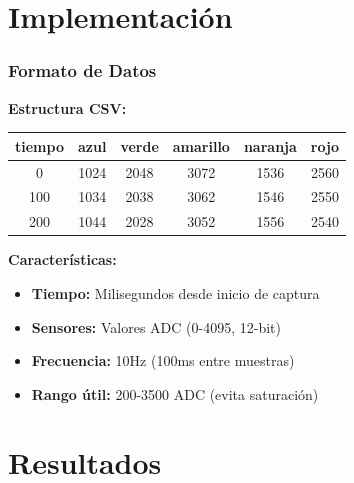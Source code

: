 \documentclass[xcolor=dvipsnames]{beamer}
\begin{document}
\begin{frame}
\begin{columns}
\begin{column}{0.4\textwidth}
        \end{column}
    \end{columns}
\end{frame}

\section{Implementación}

\begin{frame}
    \frametitle{Formato de Datos}
    \textbf{Estructura CSV:}
    \begin{center}
        \begin{tabular}{|c|c|c|c|c|c|}
            \hline
            \textbf{tiempo} & \textbf{azul} & \textbf{verde} & \textbf{amarillo} & \textbf{naranja} & \textbf{rojo} \\
            \hline
            0 & 1024 & 2048 & 3072 & 1536 & 2560 \\
            100 & 1034 & 2038 & 3062 & 1546 & 2550 \\
            200 & 1044 & 2028 & 3052 & 1556 & 2540 \\
            \hline
        \end{tabular}
    \end{center}
    
    \vspace{0.5cm}
    \textbf{Características:}
    \begin{itemize}
        \item \textbf{Tiempo:} Milisegundos desde inicio de captura
        \item \textbf{Sensores:} Valores ADC (0-4095, 12-bit)
        \item \textbf{Frecuencia:} 10Hz (100ms entre muestras)
        \item \textbf{Rango útil:} 200-3500 ADC (evita saturación)
    \end{itemize}
\end{frame}

\section{Resultados}
\end{document}
